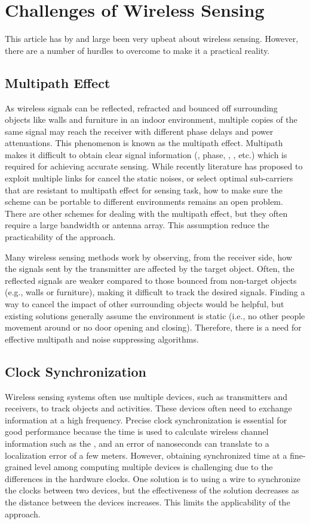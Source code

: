 \section{Challenges of Wireless Sensing}
This article has by and large been very upbeat about wireless sensing. However, there are a number of hurdles to overcome to make it a
practical reality.

\subsection{Multipath Effect}

As wireless signals can be reflected, refracted and bounced off surrounding objects like walls and furniture in an indoor environment,
multiple copies of the same signal may reach the receiver with different phase delays and power attenuations. This phenomenon is known as
the multipath effect. Multipath makes it difficult to obtain clear signal information (\RSSI, phase, \AoA, \ToF, etc.) which is required
for achieving accurate sensing. While recently literature has proposed to exploit multiple links for cancel the static noises, or select
optimal sub-carriers that are resistant to multipath effect for sensing task, how to make sure the scheme can be portable to different
environments remains an open problem. There are other schemes for dealing with the multipath effect, but they often require a large
bandwidth or antenna array. This assumption reduce the practicability of the approach.


Many wireless sensing methods work by observing, from the receiver side, how the signals sent by the transmitter are affected by the target
object. Often, the reflected signals are weaker compared to those bounced from non-target objects (e.g., walls or furniture), making it
difficult to track the desired signals. Finding a way to cancel the impact of other surrounding objects would be helpful, but existing
solutions generally assume the environment is static (i.e., no other people movement around or no door opening and closing). Therefore,
there is a need for effective multipath and noise suppressing algorithms.


\subsection{Clock Synchronization} Wireless sensing systems often use multiple devices, such as transmitters and receivers, to track
objects and activities. These devices often need to exchange information at a high frequency. Precise clock synchronization is essential
for good performance because the time is used to calculate wireless channel information such as the \ToF, and an error of nanoseconds can
translate to a localization error of a few meters. However, obtaining synchronized time at a fine-grained level among computing multiple
devices is challenging due to the differences in the hardware clocks. One solution is to using a wire to synchronize the clocks between two
devices, but the effectiveness of the solution decreases as the distance between the devices increases. This limits the applicability of
the approach.

